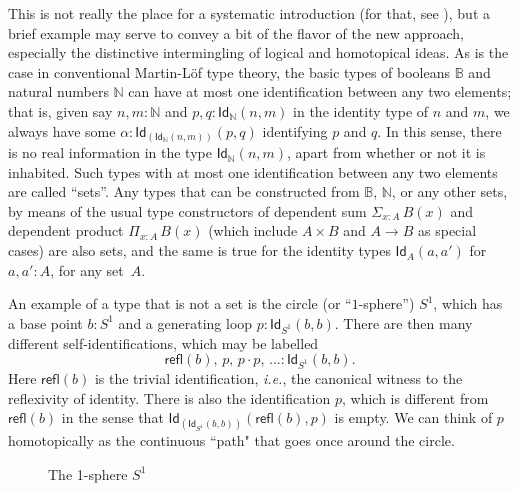 \documentclass[11pt]{article}
\newcommand{\B}{\ensuremath{\mathbb{B}}}
\newcommand{\N}{\ensuremath{\mathbb{N}}}
\newcommand{\Id}{\mathsf{Id}}
\newcommand{\id}[1]{\Id_{#1}}
\newcommand{\refl}{\mathsf{refl}}
\begin{document}
This is not really the place for a systematic introduction (for that, see \cite{HoTTbook}), but a brief example may
serve to convey a bit of the flavor of the new approach, especially the distinctive intermingling of logical and
homotopical ideas.  As is the case in conventional Martin-L\"of type theory, the basic types of booleans $\B$ and
natural numbers $\N$ can have at most one identification between any two elements; that is, given say $n, m : \N$ and
$p,q: \id{\N}(n,m)$ in the identity type of $n$ and $m$, we always have some
$\alpha:\id{\left(\id{\N}(n,m)\right)}(p,q)$ identifying $p$ and $q$.  In this sense, there is no real information in
the type $\id{\N}(n,m)$, apart from whether or not it is inhabited.  Such types with at most one identification between
any two elements are called ``sets''.  Any types that can be constructed from $\B$, $\N$, or any other sets, by means of
the usual type constructors of dependent sum $\Sigma_{x:A}\,B(x)$ and dependent product $\Pi_{x:A}\,B(x)$ (which include
$A\times B$ and $A\rightarrow B$ as special cases) are also sets, and the same is true for the identity types
$\id{A}(a,a')$ for $a,a':A$, for any set~$A$.

An example of a type that is not a set is the circle (or ``$1$-sphere'') $S^1$, which has a base point $b: S^1$ and a
generating loop $ p :\id{S^1}(b,b)$.  There are then many different self-identifications, which may be labelled
$$\refl(b),\, p,\, p\cdot p,\, ... :\id{S^1}(b,b).$$ 
Here $\refl(b)$ is the trivial identification, \textit{i.e.}, the
canonical witness to the reflexivity of identity.  There is also the identification $p$, which is different from
$\refl(b)$ in the sense that $\id{\left(\id{S^1}(b,b)\right)}(\refl(b), p)$ is empty.  We can think of $p$ homotopically
as the continuous ``path" that goes once around the circle.

\begin{figure}\centering
\caption{The 1-sphere $S^1$}\label{fig:s1}
\end{figure}
\end{document}
